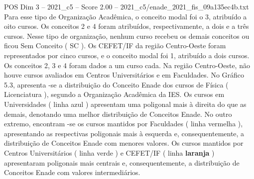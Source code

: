 \begin{textsample}{POS Dim 3 – 2021\_c5 – Score 2.00 – 2021\_c5/enade\_2021\_fis\_09a135ec4b.txt}
Para esse tipo de Organização Acadêmica, o conceito modal foi o 3, atribuído a oito cursos.
Os conceitos 2 e 4 foram atribuídos, respectivamente, a dois e a três cursos.
Nesse tipo de organização, nenhum curso recebeu os demais conceitos ou ficou Sem Conceito ( SC ).
Os CEFET/IF da região Centro-Oeste foram representados por cinco cursos, e o conceito modal foi 1, atribuído a dois cursos.
Os conceitos 2, 3 e 4 foram dados a um curso cada.
Na região Centro-Oeste, não houve cursos avaliados em Centros Universitários e em Faculdades.
No Gráfico 5.3, apresenta -se a distribuição do Conceito Enade dos cursos de Física ( Licenciatura ), segundo a Organização Acadêmica da IES.
Os cursos em Universidades ( linha azul ) apresentam uma poligonal mais à direita do que as demais, denotando uma melhor distribuição de Conceitos Enade.
No outro extremo, encontram -se os cursos mantidos por Faculdades ( linha vermelha ), apresentando as respectivas poligonais mais à esquerda e, consequentemente, a distribuição de Conceitos Enade com menores valores.
Os cursos mantidos por Centros Universitários ( linha verde ) e CEFET/IF ( linha \textbf{laranja} ) apresentaram poligonais mais centrais e, consequentemente, a distribuição de Conceitos Enade com valores intermediários.

\end{textsample}
